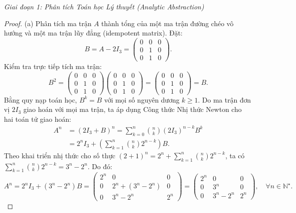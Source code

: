 \documentclass{article}
\begin{document}
\vspace{0.5em}\noindent\emph{Giai đoạn 1: Phân tích Toán học Lý thuyết (Analytic Abstraction)}

\begin{proof}
	(a) Phân tích ma trận $A$ thành tổng của một ma trận đường chéo vô hướng và một ma trận lũy đẳng (idempotent matrix). Đặt:
	\begin{equation*}
		B = A - 2I_3 = \begin{pmatrix} 0 & 0 & 0 \\ 0 & 1 & 0 \\ 0 & 1 & 0 \end{pmatrix}.
	\end{equation*}
	Kiểm tra trực tiếp tích ma trận:
	\begin{equation*}
		B^2 = \begin{pmatrix} 0 & 0 & 0 \\ 0 & 1 & 0 \\ 0 & 1 & 0 \end{pmatrix} \begin{pmatrix} 0 & 0 & 0 \\ 0 & 1 & 0 \\ 0 & 1 & 0 \end{pmatrix} = \begin{pmatrix} 0 & 0 & 0 \\ 0 & 1 & 0 \\ 0 & 1 & 0 \end{pmatrix} = B.
	\end{equation*}
	Bằng quy nạp toán học, $B^k = B$ với mọi số nguyên dương $k \ge 1$. Do ma trận đơn vị $2I_3$ giao hoán với mọi ma trận, ta áp dụng Công thức Nhị thức Newton cho hai toán tử giao hoán:
	\begin{align*}
		A^n &= (2I_3 + B)^n = \sum_{k=0}^n \binom{n}{k} (2I_3)^{n-k} B^k \\
		&= 2^n I_3 + \left( \sum_{k=1}^n \binom{n}{k} 2^{n-k} \right) B.
	\end{align*}
	Theo khai triển nhị thức cho số thực $(2 + 1)^n = 2^n + \sum_{k=1}^n \binom{n}{k} 2^{n-k}$, ta có $\sum_{k=1}^n \binom{n}{k} 2^{n-k} = 3^n - 2^n$. Do đó:
	\begin{equation*}
		A^n = 2^n I_3 + (3^n - 2^n) B = \begin{pmatrix}
			2^n & 0 & 0 \\
			0 & 2^n + (3^n - 2^n) & 0 \\
			0 & 3^n - 2^n & 2^n
		\end{pmatrix} = \begin{pmatrix}
			2^n & 0 & 0 \\
			0 & 3^n & 0 \\
			0 & 3^n - 2^n & 2^n
		\end{pmatrix}, \quad \forall n \in \mathbb{N}^\star.
	\end{equation*}
	

\end{proof}
\end{document}
